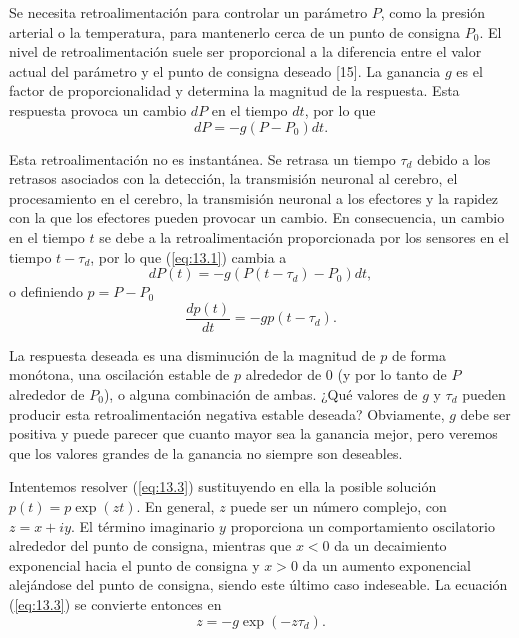 \documentclass[12pt]{book}
\begin{document}
Se necesita retroalimentación para controlar un parámetro $P$, como la presión arterial o la temperatura, para mantenerlo cerca de un punto de consigna $P_0$. El nivel de retroalimentación suele ser proporcional a la diferencia entre el valor actual del parámetro y el punto de consigna deseado [15]. La ganancia $g$ es el factor de proporcionalidad y determina la magnitud de la respuesta. Esta respuesta provoca un cambio $dP$ en el tiempo $dt$, por lo que
\begin{equation}
  dP = -g(P - P_0)dt. \label{eq:13.1}
\end{equation}

Esta retroalimentación no es instantánea. Se retrasa un tiempo $\tau_d$ debido a los retrasos asociados con la detección, la transmisión neuronal al cerebro, el procesamiento en el cerebro, la transmisión neuronal a los efectores y la rapidez con la que los efectores pueden provocar un cambio. En consecuencia, un cambio en el tiempo $t$ se debe a la retroalimentación proporcionada por los sensores en el tiempo $t - \tau_d$, por lo que (\ref{eq:13.1}) cambia a
\begin{equation}
  dP(t) = -g(P(t - \tau_d) - P_0)dt, \label{eq:13.2}
\end{equation}
o definiendo $p = P - P_0$
\begin{equation}
  \frac{dp(t)}{dt} = -g p(t - \tau_d). \label{eq:13.3}
\end{equation}

La respuesta deseada es una disminución de la magnitud de $p$ de forma monótona, una oscilación estable de $p$ alrededor de 0 (y por lo tanto de $P$ alrededor de $P_0$), o alguna combinación de ambas. ¿Qué valores de $g$ y $\tau_d$ pueden producir esta retroalimentación negativa estable deseada? Obviamente, $g$ debe ser positiva y puede parecer que cuanto mayor sea la ganancia mejor, pero veremos que los valores grandes de la ganancia no siempre son deseables.

Intentemos resolver (\ref{eq:13.3}) sustituyendo en ella la posible solución $p(t) = p \exp(zt)$. En general, $z$ puede ser un número complejo, con $z = x + iy$. El término imaginario $y$ proporciona un comportamiento oscilatorio alrededor del punto de consigna, mientras que $x < 0$ da un decaimiento exponencial hacia el punto de consigna y $x > 0$ da un aumento exponencial alejándose del punto de consigna, siendo este último caso indeseable. La ecuación (\ref{eq:13.3}) se convierte entonces en
\begin{equation}
  z = -g \exp(-z\tau_d). \label{eq:13.4}
\end{equation}
\end{document}
